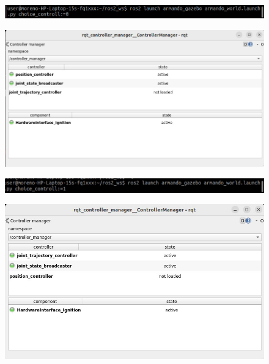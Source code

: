 \documentclass{article}
\begin{document}
\begin{enumerate}
\begin{figure}[H] %
  \centering
  \includegraphics[width=1\textwidth]{Images/4D_6.jpeg} %

  \label{fig:publishCommand}
\end{figure}
\begin{figure}[H] %
  \centering
  \includegraphics[width=1\textwidth]{Images/4D_7.jpeg} %

  \label{fig:publishCommand}
\end{figure}
\begin{figure}[H] %
  \centering
  \includegraphics[width=1\textwidth]{Images/4D_8.jpeg} %

  \label{fig:publishCommand}
\end{figure}
\begin{figure}[H] %
  \centering
  \includegraphics[width=1\textwidth]{Images/4D_9.jpeg} %

  \label{fig:publishCommand}
\end{figure}
\end{enumerate}
\end{document}
